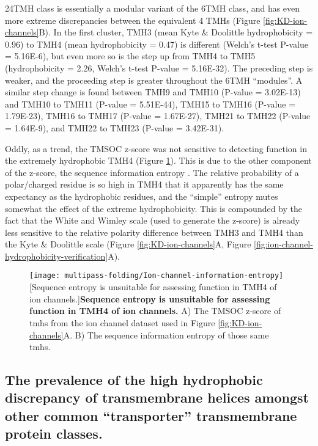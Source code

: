24TMH class is essentially a modular variant of the 6TMH class, and has even more extreme discrepancies between the equivalent 4 TMHs (Figure \ref{fig:KD-ion-channels}B).
In the first cluster, TMH3 (mean Kyte \& Doolittle hydrophobicity = 0.96) to TMH4 (mean hydrophobicity = 0.47) is different (Welch's t\--test P\--value = 5.16E-6), but even more so is the step up from TMH4 to TMH5 (hydrophobicity = 2.26, Welch's t\--test P\--value = 5.16E-32).
The preceding step is weaker, and the proceeding step is greater throughout the 6TMH ``modules''.
A similar step change is found between TMH9 and TMH10 (P\--value = 3.02E-13) and TMH10 to TMH11 (P\--value = 5.51E-44), TMH15 to TMH16 (P\--value = 1.79E-23), TMH16 to TMH17 (P\--value = 1.67E-27), TMH21 to TMH22 (P\--value = 1.64E-9), and TMH22 to TMH23 (P\--value = 3.42E-31).

Oddly, as a trend, the TMSOC  z\--score was not sensitive to detecting function in the extremely hydrophobic TMH4 (Figure \ref{fig:Ion-channel-information-entropy}).
This is due to the other component of the  z\--score, the sequence information entropy \cite{Wong2011, Wong2012}.
The relative probability of a polar/charged residue is so high in TMH4 that it apparently has the same expectancy as the hydrophobic residues, and the ``simple'' entropy mutes somewhat the effect of the extreme hydrophobicity.
This is compounded by the fact that the White and Wimley scale (used to generate the  z\--score) is already less sensitive to the relative polarity difference between TMH3 and TMH4 than the Kyte \& Doolittle scale (Figure \ref{fig:KD-ion-channels}A, Figure \ref{fig:ion-channel-hydrophobicity-verification}A).

\begin{figure}[!ht]
\centering
\texttt{[image: multipass-folding/Ion-channel-information-entropy]}
		[Sequence entropy is unsuitable for assessing function in TMH4 of ion channels.]{\textbf{Sequence entropy is unsuitable for assessing function in TMH4 of ion channels.}
    A) The TMSOC  z\--score \cite{Wong2011, Wong2012} of \gls{tmh}s from the ion channel dataset used in Figure \ref{fig:KD-ion-channels}A.
    B) The sequence information entropy of those same \gls{tmh}s.
    }

\label{fig:Ion-channel-information-entropy}
\end{figure}


\subsection{The prevalence of the high hydrophobic discrepancy of transmembrane helices amongst other common ``transporter'' transmembrane protein classes.}

